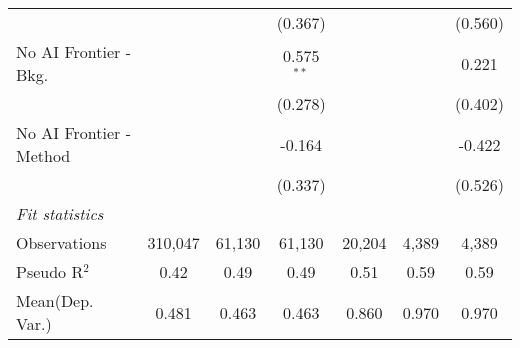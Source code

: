 \begin{tabular}{lcccccc}
                           &              &         & (0.367)      &              &         & (0.560)\\   
   No AI Frontier - Bkg.   &              &         & 0.575$^{**}$ &              &         & 0.221\\   
                           &              &         & (0.278)      &              &         & (0.402)\\   
   No AI Frontier - Method &              &         & -0.164       &              &         & -0.422\\   
                           &              &         & (0.337)      &              &         & (0.526)\\   
   \midrule
   \emph{Fit statistics}\\
   Observations            & 310,047      & 61,130  & 61,130       & 20,204       & 4,389   & 4,389\\  
   Pseudo R$^2$            & 0.42         & 0.49    & 0.49         & 0.51         & 0.59    & 0.59\\  
Mean(Dep. Var.) & 0.481 & 0.463 & 0.463 & 0.860 & 0.970 & 0.970 \\
   

\end{tabular}
